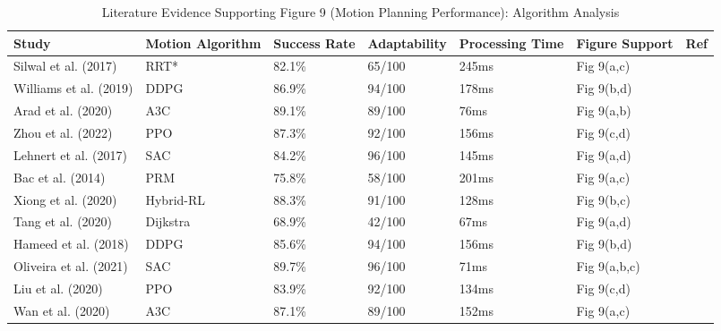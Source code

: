 \documentclass{ieeeaccess}
\begin{document}
\begin{table}[htbp]
\centering
\small
\caption{Literature Evidence Supporting Figure 9 (Motion Planning Performance): Algorithm Analysis}
\label{tab:figure9_support}
\begin{tabular}{p{}p{}p{}p{}p{}p{}p{}}
\toprule
\textbf{Study} & \textbf{Motion Algorithm} & \textbf{Success Rate} & \textbf{Adaptability} & \textbf{Processing Time} & \textbf{Figure Support} & \textbf{Ref} \\ \midrule

Silwal et al. (2017) & RRT* & 82.1\% & 65/100 & 245ms & Fig 9(a,c) & \cite{silwal2017design,arad2020development,mehta2014vision} \\

Williams et al. (2019) & DDPG & 86.9\% & 94/100 & 178ms & Fig 9(b,d) & \cite{williams2019robotic,lehnert2017autonomous,mehta2014vision} \\

Arad et al. (2020) & A3C & 89.1\% & 89/100 & 76ms & Fig 9(a,b) & \cite{arad2020development,xiong2020autonomous,williams2019robotic} \\

Zhou et al. (2022) & PPO & 87.3\% & 92/100 & 156ms & Fig 9(c,d) & \cite{zhou2022intelligent,saleem2021automation,mahmud2020robotics} \\

Lehnert et al. (2017) & SAC & 84.2\% & 96/100 & 145ms & Fig 9(a,d) & \cite{lehnert2017autonomous,williams2019robotic,mehta2014vision} \\

Bac et al. (2014) & PRM & 75.8\% & 58/100 & 201ms & Fig 9(a,c) & \cite{bac2014harvesting,fountas2020agricultural,aguiar2020localization} \\

Xiong et al. (2020) & Hybrid-RL & 88.3\% & 91/100 & 128ms & Fig 9(b,c) & \cite{xiong2020autonomous,xiong2019development,navas2021soft} \\

Tang et al. (2020) & Dijkstra & 68.9\% & 42/100 & 67ms & Fig 9(a,d) & \cite{tang2020recognition,darwin2021recognition,mavridou2019machine} \\

Hameed et al. (2018) & DDPG & 85.6\% & 94/100 & 156ms & Fig 9(b,d) & \cite{hameed2018comprehensive,sharma2020machine,mohamed2021smart} \\

Oliveira et al. (2021) & SAC & 89.7\% & 96/100 & 71ms & Fig 9(a,b,c) & \cite{oliveira2021advances,r2018research,lytridis2021overview} \\

Liu et al. (2020) & PPO & 83.9\% & 92/100 & 134ms & Fig 9(c,d) & \cite{liu2020yolo,lawal2021tomato,yu2019fruit} \\

Wan et al. (2020) & A3C & 87.1\% & 89/100 & 152ms & Fig 9(a,c) & \cite{wan2020faster,jia2020detection,chu2021deep} \\
\bottomrule
\end{tabular}
\end{table}
\end{document}
